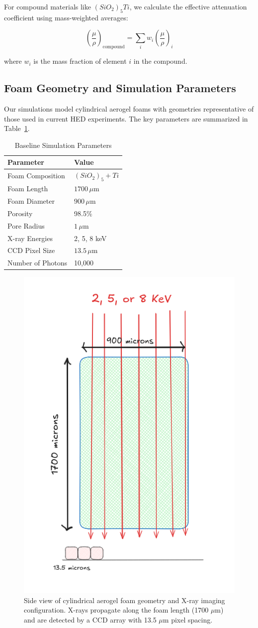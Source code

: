 \documentclass[twocolumn]{aastex701}
\begin{document}
For compound materials like $(SiO_2)_5Ti$, we calculate the effective attenuation coefficient using mass-weighted averages:

\begin{equation}
\left(\frac{\mu}{\rho}\right)_{\text{compound}} = \sum_i w_i \left(\frac{\mu}{\rho}\right)_i
\end{equation}

where $w_i$ is the mass fraction of element $i$ in the compound.

\subsection{Foam Geometry and Simulation Parameters}

Our simulations model cylindrical aerogel foams with geometries representative of those used in current HED experiments. The key parameters are summarized in Table~\ref{tab:params}.

\begin{table}[h!]
\centering
\caption{Baseline Simulation Parameters}
\begin{tabular}{ll}
\hline
\textbf{Parameter} & \textbf{Value} \\
\hline
Foam Composition & $(SiO_2)_5+Ti$ \\
Foam Length & $1700\,\mu\text{m}$ \\
Foam Diameter & $900\,\mu\text{m}$ \\
Porosity & 98.5\% \\
Pore Radius & $1\,\mu\text{m}$ \\
X-ray Energies & 2, 5, 8 keV \\
CCD Pixel Size & $13.5\,\mu\text{m}$ \\
Number of Photons & 10,000 \\
\hline
\end{tabular}
\label{tab:params}
\end{table}

\begin{figure}[t]
    \centering
    \includegraphics[width=0.45\linewidth]{foamimagingparameters.png}
    \caption{Side view of cylindrical aerogel foam geometry and X-ray imaging configuration. X-rays propagate along the foam length (1700 $\mu$m) and are detected by a CCD array with 13.5 $\mu$m pixel spacing.}
    \label{fig:foam_geometry}
\end{figure}
\end{document}
